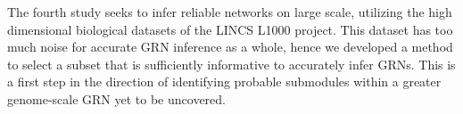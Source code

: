 \begin{abstracts}
The fourth study seeks to infer reliable networks on large scale, utilizing the high dimensional biological datasets of the LINCS L1000 project.  This dataset has too much noise for accurate GRN inference as a whole, hence we developed a method to select a  subset that is sufficiently informative to accurately infer GRNs. This is a first step in the direction of identifying probable submodules within a greater genome-scale GRN yet to be uncovered.




\end{abstracts}

